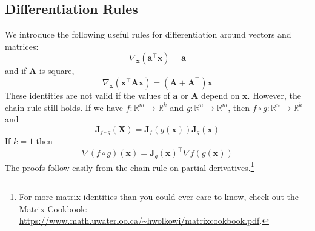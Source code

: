 \documentclass{article}
\begin{document}
\subsection{Differentiation Rules}
We introduce the following useful rules for differentiation around vectors and matrices: $$\nabla_{\mathbf{x}}(\mathbf{a}^{\top}\mathbf{x}) = \mathbf{a}$$ and if $\mathbf{A}$ is square, $$\nabla_{\mathbf{x}}(\mathbf{x}^{\top}\mathbf{Ax}) = \mathbf{(A + A^{\top})x}$$ These identities are not valid if the values of $\mathbf{a}$ or $\mathbf{A}$ depend on $\mathbf{x}$. However, the chain rule still holds. If we have $f: \mathbb{R}^m \rightarrow \mathbb{R}^k$ and $g: \mathbb{R}^n \rightarrow \mathbb{R}^m$, then $f \circ g: \mathbb{R}^n \rightarrow \mathbb{R}^k$ and $$\mathbf{J}_{f \circ g}(\mathbf{X}) = \mathbf{J}_f(g(\mathbf{x}))\mathbf{J}_g(\mathbf{x})$$ If $k = 1$ then $$\nabla (f \circ g)(\mathbf{x}) = \mathbf{J}_g(\mathbf{x})^{\top}\nabla f(g(\mathbf{x}))$$ The proofs follow easily from the chain rule on partial derivatives.\footnote{For more matrix identities than you could ever care to know, check out the Matrix Cookbook: \url{https://www.math.uwaterloo.ca/~hwolkowi/matrixcookbook.pdf}.}

\clearpage
\end{document}
